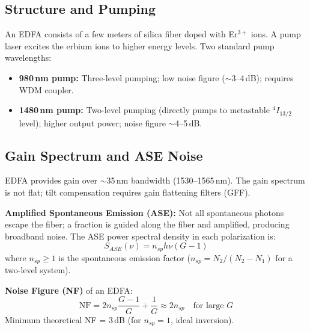\documentclass[12pt,a4paper]{article}
\begin{document}
\subsection{Structure and Pumping}
An EDFA consists of a few meters of silica fiber doped with Er$^{3+}$ ions. A pump laser excites the erbium ions to higher energy levels. Two standard pump wavelengths:
\begin{itemize}[leftmargin=*, itemsep=2pt]
  \item \textbf{980\,nm pump:} Three-level pumping; low noise figure ($\sim$3--4\,dB); requires WDM coupler.
  \item \textbf{1480\,nm pump:} Two-level pumping (directly pumps to metastable $^4I_{13/2}$ level); higher output power; noise figure $\sim$4--5\,dB.
\end{itemize}

\subsection{Gain Spectrum and ASE Noise}
EDFA provides gain over $\sim$35\,nm bandwidth (1530--1565\,nm). The gain spectrum is not flat; tilt compensation requires gain flattening filters (GFF).

\textbf{Amplified Spontaneous Emission (ASE):} Not all spontaneous photons escape the fiber; a fraction is guided along the fiber and amplified, producing broadband noise. The ASE power spectral density in each polarization is:
\[
S_{ASE}(\nu) = n_{sp} h\nu (G-1)
\]
where $n_{sp} \geq 1$ is the spontaneous emission factor ($n_{sp} = N_2/(N_2 - N_1)$ for a two-level system).

\textbf{Noise Figure (NF)} of an EDFA:
\[
\text{NF} = 2n_{sp}\frac{G-1}{G} + \frac{1}{G} \approx 2n_{sp} \quad \text{for large } G
\]
Minimum theoretical NF = 3\,dB (for $n_{sp} = 1$, ideal inversion).
\end{document}
